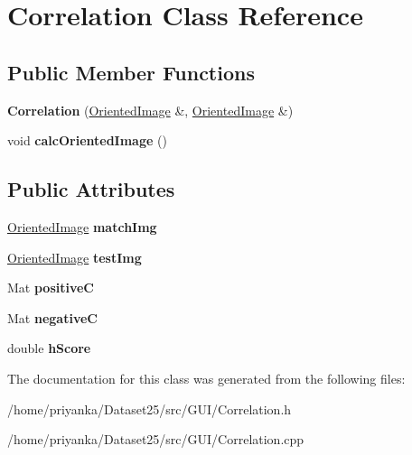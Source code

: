 \hypertarget{classCorrelation}{\section{\-Correlation \-Class \-Reference}
\label{classCorrelation}
}
\subsection*{\-Public \-Member \-Functions}
\begin{DoxyCompactItemize}
\item 
\hypertarget{classCorrelation_ab5985ae6e12ec535ba5140b266f3a193}{{\bfseries \-Correlation} (\hyperlink{classOrientedImage}{\-Oriented\-Image} \&, \hyperlink{classOrientedImage}{\-Oriented\-Image} \&)}\label{classCorrelation_ab5985ae6e12ec535ba5140b266f3a193}

\item 
\hypertarget{classCorrelation_a75340986ddb889cd1b5f495c7033c55f}{void {\bfseries calc\-Oriented\-Image} ()}\label{classCorrelation_a75340986ddb889cd1b5f495c7033c55f}

\end{DoxyCompactItemize}
\subsection*{\-Public \-Attributes}
\begin{DoxyCompactItemize}
\item 
\hypertarget{classCorrelation_a8c7d9af6b18f82fc83f72007193def0b}{\hyperlink{classOrientedImage}{\-Oriented\-Image} {\bfseries match\-Img}}\label{classCorrelation_a8c7d9af6b18f82fc83f72007193def0b}

\item 
\hypertarget{classCorrelation_a585146f25435129442f5112e9949e3fc}{\hyperlink{classOrientedImage}{\-Oriented\-Image} {\bfseries test\-Img}}\label{classCorrelation_a585146f25435129442f5112e9949e3fc}

\item 
\hypertarget{classCorrelation_ab8b8eb05b1a5e4ae3f8532b1d2dcf1f0}{\-Mat {\bfseries positive\-C}}\label{classCorrelation_ab8b8eb05b1a5e4ae3f8532b1d2dcf1f0}

\item 
\hypertarget{classCorrelation_a56847168d04bbb6f6ef415cb0f3ead58}{\-Mat {\bfseries negative\-C}}\label{classCorrelation_a56847168d04bbb6f6ef415cb0f3ead58}

\item 
\hypertarget{classCorrelation_aae3b98038a9ee71343b4305d67a1c858}{double {\bfseries h\-Score}}\label{classCorrelation_aae3b98038a9ee71343b4305d67a1c858}

\end{DoxyCompactItemize}


\-The documentation for this class was generated from the following files\-:\begin{DoxyCompactItemize}
\item 
/home/priyanka/\-Dataset25/src/\-G\-U\-I/\-Correlation.\-h\item 
/home/priyanka/\-Dataset25/src/\-G\-U\-I/\-Correlation.\-cpp\end{DoxyCompactItemize}
